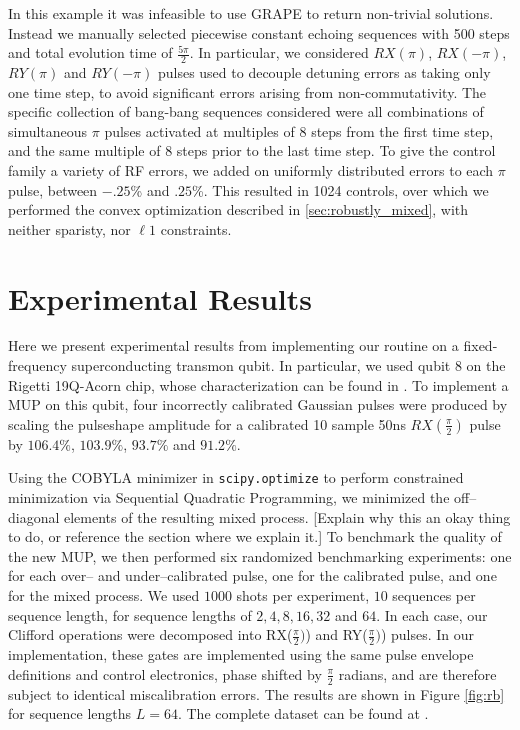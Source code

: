 \documentclass[aps,nofootinbib,pra,notitlepage,twocolumn]{revtex4-1}
\newcommand{\note}[1]{{\color{red}[#1]}}
\begin{document}
In this example it was infeasible to use GRAPE to return non-trivial solutions. Instead we manually selected piecewise constant echoing sequences with 500 steps and total evolution time of $\frac{5\pi}{2}$. In particular, we considered $RX(\pi)$, $RX(-\pi)$, $RY(\pi)$ and $RY(-\pi)$ pulses used to decouple detuning errors as taking only one time step, to avoid significant errors arising from non-commutativity. The specific collection of bang-bang sequences \cite{bang-bang} considered were all combinations of simultaneous $\pi$ pulses activated at multiples of $8$ steps from the first time step, and the same multiple of $8$ steps prior to the last time step. To give the control family a variety of RF errors, we added on uniformly distributed errors to each $\pi$ pulse, between $-.25$\% and $.25$\%. This resulted in 1024 controls, over which we performed the convex optimization described in \ref{sec:robustly_mixed}, with neither sparisty, nor $\ell1$ constraints.
\section{Experimental Results}
\label{sec:experimental_results}
Here we present experimental results from implementing our routine on a fixed-frequency superconducting transmon qubit. In particular, we used qubit 8 on the Rigetti 19Q-Acorn chip, whose characterization can be found in \cite{1712.05771}. To implement a MUP on this qubit, four incorrectly calibrated Gaussian pulses were produced by scaling the pulseshape amplitude for a calibrated 10 sample 50ns $RX(\frac{\pi}{2})$ pulse by $106.4\%$,  $103.9\%$, $93.7\%$ and $91.2\%$.

Using the COBYLA minimizer in \texttt{scipy.optimize}\cite{scipy} to perform constrained minimization via Sequential Quadratic Programming\cite{wright1999numerical}, we minimized the off--diagonal elements of the resulting mixed process. \note{Explain why this an okay thing to do, or reference the section where we explain it.} To benchmark the quality of the new MUP, we then performed six randomized benchmarking experiments\cite{Magesan2011}: one for each over-- and under--calibrated pulse, one for the calibrated pulse, and one for the mixed process. We used $1000$ shots per experiment, $10$ sequences per sequence length, for sequence lengths of $2, 4, 8, 16, 32$ and $64$. In each case, our Clifford operations were decomposed into RX($\frac{\pi}{2})$) and RY($\frac{\pi}{2})$) pulses. In our implementation, these gates are implemented using the same pulse envelope definitions and control electronics, phase shifted by $\frac{\pi}{2}$ radians, and are therefore subject to identical miscalibration errors. The results are shown in Figure \ref{fig:rb} for sequence lengths $L=64$. The complete dataset can be found at  \cite{decorrelating_errors}.
\end{document}
